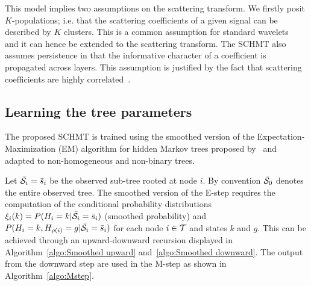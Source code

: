 \documentclass{article}
\begin{document}
    This model implies two assumptions on the scattering transform.  We firstly posit $K$-populations; i.e. that the scattering coefficients of a given signal can be described by $K$ clusters. This is a common assumption for standard wavelets~\cite{kingsbury2001complex} and it can hence be extended to the scattering transform. The SCHMT also assumes persistence in that the informative character of a
    coefficient is propagated across layers. This assumption is justified by the fact that scattering coefficients are highly correlated~\cite{oyallon2014deep}.
  
  \vspace{-5pt}
  \subsection{Learning the tree parameters}
    \label{subsec:SCHMT/Learning}    
    \vspace{-5pt}
    The proposed SCHMT is trained using the smoothed version of the Expectation-Maximization (EM) algorithm for hidden Markov trees proposed by~\cite{durand2001statistical} and adapted to non-homogeneous and non-binary trees.
    
    Let $\bar{\mathcal{S}}_{i}= \bar{s}_{i}$ be the observed sub-tree rooted at node $i$. By convention $\bar{\mathcal{S}}_{0}$ denotes the entire observed tree. The smoothed version of the E-step requires the computation of the conditional probability distributions $\xi_{i}(k) = P(H_{i}=k | \bar{\mathcal{S}}_{i}= \bar{s}_{i})$ (smoothed probability) and $P(H_{i}=k, H_{\rho(i)}=g | \bar{\mathcal{S}}_{i}= \bar{s}_{i})$ for each node $i \in \mathcal{T}$ and states $k$ and $g$. This can be achieved through an upward-downward recursion displayed in Algorithm~\ref{algo:Smoothed upward} and~\ref{algo:Smoothed downward}. The output from the downward step are used in the M-step as shown in Algorithm~\ref{algo:Mstep}.
    
\end{document}
